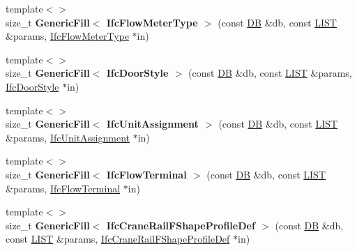 \begin{DoxyCompactItemize}
\item 
\hypertarget{namespace_assimp_1_1_s_t_e_p_a57914575949a101aa9e96075c5575c38}{{\footnotesize template$<$$>$ }\\size\+\_\+t {\bfseries Generic\+Fill$<$ Ifc\+Flow\+Meter\+Type $>$} (const \hyperlink{class_assimp_1_1_s_t_e_p_1_1_d_b}{D\+B} \&db, const \hyperlink{class_assimp_1_1_s_t_e_p_1_1_e_x_p_r_e_s_s_1_1_l_i_s_t}{L\+I\+S\+T} \&params, \hyperlink{struct_assimp_1_1_i_f_c_1_1_ifc_flow_meter_type}{Ifc\+Flow\+Meter\+Type} $\ast$in)}\label{namespace_assimp_1_1_s_t_e_p_a57914575949a101aa9e96075c5575c38}

\item 
\hypertarget{namespace_assimp_1_1_s_t_e_p_afc22cd6c4a6b9abb9689e3da45a120ef}{{\footnotesize template$<$$>$ }\\size\+\_\+t {\bfseries Generic\+Fill$<$ Ifc\+Door\+Style $>$} (const \hyperlink{class_assimp_1_1_s_t_e_p_1_1_d_b}{D\+B} \&db, const \hyperlink{class_assimp_1_1_s_t_e_p_1_1_e_x_p_r_e_s_s_1_1_l_i_s_t}{L\+I\+S\+T} \&params, \hyperlink{struct_assimp_1_1_i_f_c_1_1_ifc_door_style}{Ifc\+Door\+Style} $\ast$in)}\label{namespace_assimp_1_1_s_t_e_p_afc22cd6c4a6b9abb9689e3da45a120ef}

\item 
\hypertarget{namespace_assimp_1_1_s_t_e_p_a64813f095eef365eaf2035c69a556097}{{\footnotesize template$<$$>$ }\\size\+\_\+t {\bfseries Generic\+Fill$<$ Ifc\+Unit\+Assignment $>$} (const \hyperlink{class_assimp_1_1_s_t_e_p_1_1_d_b}{D\+B} \&db, const \hyperlink{class_assimp_1_1_s_t_e_p_1_1_e_x_p_r_e_s_s_1_1_l_i_s_t}{L\+I\+S\+T} \&params, \hyperlink{struct_assimp_1_1_i_f_c_1_1_ifc_unit_assignment}{Ifc\+Unit\+Assignment} $\ast$in)}\label{namespace_assimp_1_1_s_t_e_p_a64813f095eef365eaf2035c69a556097}

\item 
\hypertarget{namespace_assimp_1_1_s_t_e_p_a4755b11e04e49fe69f2e85301236f82d}{{\footnotesize template$<$$>$ }\\size\+\_\+t {\bfseries Generic\+Fill$<$ Ifc\+Flow\+Terminal $>$} (const \hyperlink{class_assimp_1_1_s_t_e_p_1_1_d_b}{D\+B} \&db, const \hyperlink{class_assimp_1_1_s_t_e_p_1_1_e_x_p_r_e_s_s_1_1_l_i_s_t}{L\+I\+S\+T} \&params, \hyperlink{struct_assimp_1_1_i_f_c_1_1_ifc_flow_terminal}{Ifc\+Flow\+Terminal} $\ast$in)}\label{namespace_assimp_1_1_s_t_e_p_a4755b11e04e49fe69f2e85301236f82d}

\item 
\hypertarget{namespace_assimp_1_1_s_t_e_p_abe1dc583332d3e4ce8be4ecee2635549}{{\footnotesize template$<$$>$ }\\size\+\_\+t {\bfseries Generic\+Fill$<$ Ifc\+Crane\+Rail\+F\+Shape\+Profile\+Def $>$} (const \hyperlink{class_assimp_1_1_s_t_e_p_1_1_d_b}{D\+B} \&db, const \hyperlink{class_assimp_1_1_s_t_e_p_1_1_e_x_p_r_e_s_s_1_1_l_i_s_t}{L\+I\+S\+T} \&params, \hyperlink{struct_assimp_1_1_i_f_c_1_1_ifc_crane_rail_f_shape_profile_def}{Ifc\+Crane\+Rail\+F\+Shape\+Profile\+Def} $\ast$in)}\label{namespace_assimp_1_1_s_t_e_p_abe1dc583332d3e4ce8be4ecee2635549}


\end{DoxyCompactItemize}
